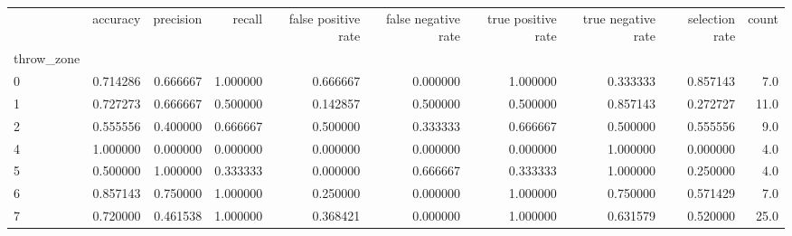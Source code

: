 \begin{tabular}{lrrrrrrrrr}
\toprule
{} &  accuracy &  precision &    recall &  false positive rate &  false negative rate &  true positive rate &  true negative rate &  selection rate &  count \\
throw\_zone &           &            &           &                      &                      &                     &                     &                 &        \\
\midrule
0          &  0.714286 &   0.666667 &  1.000000 &             0.666667 &             0.000000 &            1.000000 &            0.333333 &        0.857143 &    7.0 \\
1          &  0.727273 &   0.666667 &  0.500000 &             0.142857 &             0.500000 &            0.500000 &            0.857143 &        0.272727 &   11.0 \\
2          &  0.555556 &   0.400000 &  0.666667 &             0.500000 &             0.333333 &            0.666667 &            0.500000 &        0.555556 &    9.0 \\
4          &  1.000000 &   0.000000 &  0.000000 &             0.000000 &             0.000000 &            0.000000 &            1.000000 &        0.000000 &    4.0 \\
5          &  0.500000 &   1.000000 &  0.333333 &             0.000000 &             0.666667 &            0.333333 &            1.000000 &        0.250000 &    4.0 \\
6          &  0.857143 &   0.750000 &  1.000000 &             0.250000 &             0.000000 &            1.000000 &            0.750000 &        0.571429 &    7.0 \\
7          &  0.720000 &   0.461538 &  1.000000 &             0.368421 &             0.000000 &            1.000000 &            0.631579 &        0.520000 &   25.0 \\
\bottomrule
\end{tabular}
